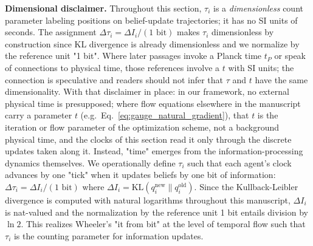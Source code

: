 \documentclass[11pt]{article}
\begin{document}
\textbf{Dimensional disclaimer.} Throughout this section, $\tau_i$ is a \emph{dimensionless} count parameter labeling positions on belief-update trajectories; it has no SI units of seconds. The assignment $\Delta \tau_i = \Delta I_i / (1\text{ bit})$ makes $\tau_i$ dimensionless by construction since KL divergence is already dimensionless and we normalize by the reference unit "1 bit". Where later passages invoke a Planck time $t_P$ or speak of connections to physical time, those references involve a $t$ with SI units; the connection is speculative and readers should not infer that $\tau$ and $t$ have the same dimensionality. With that disclaimer in place: in our framework, no external physical time is presupposed; where flow equations elsewhere in the manuscript carry a parameter $t$ (e.g.\ Eq.~\eqref{eq:gauge_natural_gradient}), that $t$ is the iteration or flow parameter of the optimization scheme, not a background physical time, and the clocks of this section read it only through the discrete updates taken along it. Instead, "time" emerges from the information-processing dynamics themselves. We operationally define $\tau_i$ such that each agent's clock advances by one "tick" when it updates beliefs by one bit of information: $\Delta \tau_i = \Delta I_i / (1 \text{ bit})$ where $\Delta I_i = \mathrm{KL}(q_i^{\text{new}} \| q_i^{\text{old}})$. Since the Kullback-Leibler divergence is computed with natural logarithms throughout this manuscript, $\Delta I_i$ is nat-valued and the normalization by the reference unit 1 bit entails division by $\ln 2$. This realizes Wheeler's "it from bit" at the level of temporal flow such that $\tau_i$ is the counting parameter for information updates.
\end{document}
